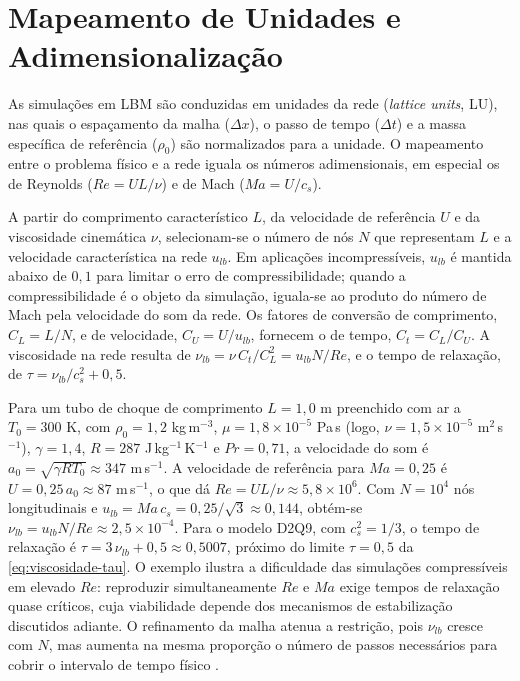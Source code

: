 
\section{Mapeamento de Unidades e Adimensionalização}\label{sec:lbm-unidades}

As simulações em LBM são conduzidas em unidades da rede (\textit{lattice units}, LU), nas quais o espaçamento da malha ($\Delta x$), o passo de tempo ($\Delta t$) e a massa específica de referência ($\rho_0$) são normalizados para a unidade.
O mapeamento entre o problema físico e a rede iguala os números adimensionais, em especial os de Reynolds ($Re = U L / \nu$) e de Mach ($Ma = U / c_s$).

A partir do comprimento característico $L$, da velocidade de referência $U$ e da viscosidade cinemática $\nu$, selecionam-se o número de nós $N$ que representam $L$ e a velocidade característica na rede $u_{lb}$.
Em aplicações incompressíveis, $u_{lb}$ é mantida abaixo de $0{,}1$ para limitar o erro de compressibilidade; quando a compressibilidade é o objeto da simulação, iguala-se ao produto do número de Mach pela velocidade do som da rede.
Os fatores de conversão de comprimento, $C_L = L/N$, e de velocidade, $C_U = U/u_{lb}$, fornecem o de tempo, $C_t = C_L / C_U$.
A viscosidade na rede resulta de $\nu_{lb} = \nu\, C_t / C_L^2 = u_{lb} N / Re$, e o tempo de relaxação, de $\tau = \nu_{lb} / c_s^2 + 0{,}5$.

Para um tubo de choque de comprimento $L = 1{,}0$ m preenchido com ar a $T_0 = 300$ K, com $\rho_0 = 1{,}2$ kg\,m$^{-3}$, $\mu = 1{,}8 \times 10^{-5}$ Pa\,s (logo, $\nu = 1{,}5 \times 10^{-5}$ m$^2$\,s$^{-1}$), $\gamma = 1{,}4$, $R = 287$ J\,kg$^{-1}$\,K$^{-1}$ e $Pr = 0{,}71$, a velocidade do som é $a_0 = \sqrt{\gamma R T_0} \approx 347$ m\,s$^{-1}$.
A velocidade de referência para $Ma = 0{,}25$ é $U = 0{,}25\, a_0 \approx 87$ m\,s$^{-1}$, o que dá $Re = U L / \nu \approx 5{,}8 \times 10^{6}$.
Com $N = 10^{4}$ nós longitudinais e $u_{lb} = Ma\, c_s = 0{,}25/\sqrt{3} \approx 0{,}144$, obtém-se $\nu_{lb} = u_{lb} N / Re \approx 2{,}5 \times 10^{-4}$.
Para o modelo D2Q9, com $c_s^2 = 1/3$, o tempo de relaxação é $\tau = 3\, \nu_{lb} + 0{,}5 \approx 0{,}5007$, próximo do limite $\tau = 0{,}5$ da \eqref{eq:viscosidade-tau}.
O exemplo ilustra a dificuldade das simulações compressíveis em elevado $Re$: reproduzir simultaneamente $Re$ e $Ma$ exige tempos de relaxação quase críticos, cuja viabilidade depende dos mecanismos de estabilização discutidos adiante.
O refinamento da malha atenua a restrição, pois $\nu_{lb}$ cresce com $N$, mas aumenta na mesma proporção o número de passos necessários para cobrir o intervalo  de tempo físico \parencite{Rathnayake2024}.

